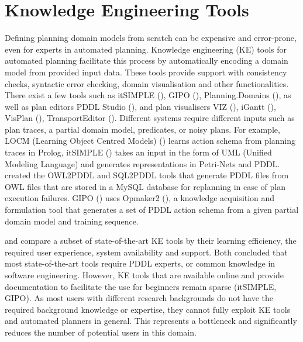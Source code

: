 \section{Knowledge Engineering Tools}\label{subsec:Knowledge Engineering}
Defining planning domain models from scratch can be expensive and error-prone, even for experts in automated planning.
Knowledge engineering (KE) tools for automated planning facilitate this process by automatically encoding a domain model from provided input data.
These tools provide support with consistency checks, syntactic error checking, domain visualisation and other functionalities.
There exist a few tools such as itSIMPLE (\cite{vaquero2013itsimple}), GIPO (\cite{simpson2007planning}), Planning.Domains (\cite{muise2016planning}), 
as well as plan editors \eg PDDL Studio (\cite{plch2012inspect}), and plan visualisers \eg VIZ (\cite{vodrazka2010visual}), iGantt (\cite{bartak2009local}), VisPlan (\cite{glinsky2011visplan}), TransportEditor (\cite{vskopek2017transporteditor}).
Different systems require different inputs such as plan traces, a partial domain model, predicates, or noisy plans.
For example, LOCM (Learning Object Centred Models) (\cite{cresswell2013acquiring}) learns action schema from planning traces in Prolog, 
itSIMPLE () takes an input in the form of UML (Unified Modeling Language) %
and generates representations in Petri-Nets %
and PDDL. 
\cite{kootbally2015towards} created the OWL2PDDL and SQL2PDDL tools that generate PDDL files from OWL files that are stored in a MySQL database for replanning in case of plan execution failures.
GIPO () uses Opmaker2 (\cite{mccluskey2009automated}), a knowledge acquisition and formulation tool that generates a set of PDDL action schema from a given partial domain model and training sequence.

\cite{shah2013knowledge} and \cite{jilani2014automated} compare a subset of state-of-the-art KE tools by their learning efficiency, the required user experience, system availability and support.
Both concluded that most state-of-the-art tools require PDDL experts, or common knowledge in software engineering.
However, KE tools that are available online and provide documentation to facilitate the use for beginners remain sparse (\eg itSIMPLE, GIPO).
As most users with different research backgrounds do not have the required background knowledge or expertise, they cannot fully exploit KE tools and automated planners in general.
This represents a bottleneck and significantly reduces the number of potential users in this domain.

